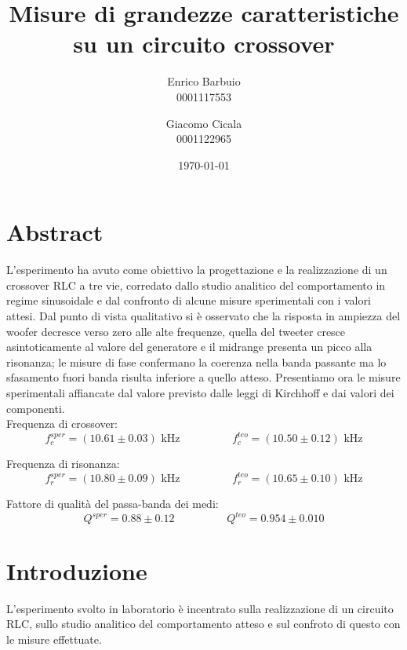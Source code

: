 \documentclass[12pt,italian]{article}
\title{Misure di grandezze caratteristiche su un circuito crossover}
\author{Enrico Barbuio \\ 0001117553 \and Giacomo Cicala \\ 0001122965}
\date{\today}
\begin{document}
\maketitle
\section*{Abstract}

L'esperimento ha avuto come obiettivo la progettazione e la realizzazione di un
crossover RLC a tre vie, corredato dallo studio analitico del comportamento in
regime sinusoidale e dal confronto di alcune misure sperimentali con i valori
attesi. Dal punto di vista qualitativo si è osservato che la risposta in
ampiezza del woofer decresce verso zero alle alte frequenze, quella del tweeter
cresce asintoticamente al valore del generatore e il midrange presenta un picco
alla risonanza; le misure di fase confermano la coerenza nella banda passante
ma lo sfasamento fuori banda risulta inferiore a quello atteso. Presentiamo ora
le misure sperimentali affiancate dal valore previsto dalle leggi di Kirchhoff
e dai valori dei componenti.\\ Frequenza di crossover: \begin{equation*}
	f_{c}^{sper} = (10.61 \pm 0.03) \text{ kHz} \hspace{2cm} f_{c}^{teo} = (10.50
	\pm 0.12) \text{ kHz} \end{equation*}

\noindent
Frequenza di risonanza:
\begin{equation*}
	f_{r}^{sper} = (10.80 \pm 0.09) \text{ kHz} \hspace{2cm} f_{r}^{teo} = (10.65
	\pm 0.10) \text{ kHz}
\end{equation*}

\noindent
Fattore di qualità del passa-banda dei medi:
\begin{equation*}
	Q^{sper} = 0.88 \pm 0.12  \hspace{2cm}  Q^{teo} = 0.954 \pm 0.010
\end{equation*}

\section*{Introduzione}

L'esperimento svolto in laboratorio è incentrato sulla realizzazione di un
circuito RLC, sullo studio analitico del comportamento atteso e sul confroto di
questo con le misure effettuate.
\end{document}

